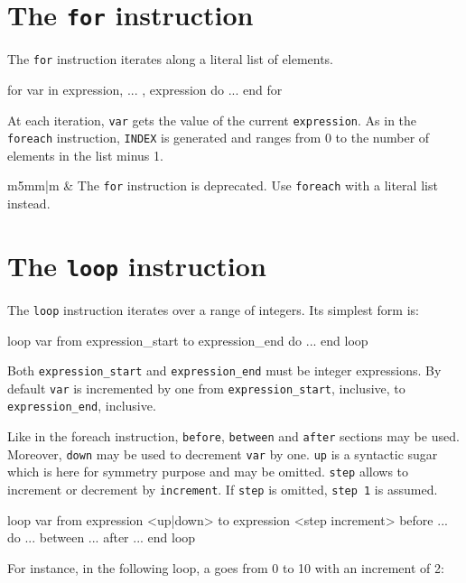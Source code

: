 \documentclass[10pt,openright,twosides,final]{memoir}
\newcommand{\var}[1]{{\small\ttfamily #1}}
\newcommand{\icst}[1]{{\footnotesize\ttfamily\colorbox{light-blue}{#1}}}
\newcommand{\gtlinline}[1]{\colorbox{light-blue}{\lstinline[language=gtl]{#1}}}
\newcommand\Warning{%
 \makebox[1.4em][c]{%
 \makebox[0pt][c]{\raisebox{-.05em}{\scriptsize!}}%
 \makebox[0pt][c]{\raisebox{-.2em}{\color{red}\Large$\bigtriangleup$}}}}%
\newcommand{\warning}[1]{%
\vspace{1em}
\hspace{-18.3mm}
\rowcolors{1}{white}{light-gray}
\begin{tabular}[b]{m{5mm}|m{\linewidth}}
\Warning & #1\\
\end{tabular}
}
\begin{document}
%
%
\section{The \texttt{for} instruction}

The \gtlinline{for} instruction iterates along a literal list of elements.

\begin{gtl}
for var in expression, ... , expression do
  ...
end for
\end{gtl}

At each iteration, \gtlinline{var} gets the value of the current \gtlinline{expression}. As in the \gtlinline{foreach} instruction, \gtlinline{INDEX} is generated and ranges from \icst{0} to the number of elements in the list minus 1.

\warning{The \gtlinline{for} instruction is deprecated. Use \gtlinline{foreach} with a literal list instead.}

\section{The \texttt{loop} instruction}

The \gtlinline{loop} instruction iterates over a range of integers. Its simplest form is:

\begin{gtl}
loop var from expression_start to expression_end do
  ...
end loop
\end{gtl}

Both \gtlinline{expression_start} and \gtlinline{expression_end} must be integer expressions. By default \gtlinline{var} is incremented by one from \gtlinline{expression_start}, inclusive, to \gtlinline{expression_end}, inclusive. 

Like in the foreach instruction, \gtlinline{before},  \gtlinline{between} and \gtlinline{after} sections may be used. Moreover, \gtlinline{down} may be used to decrement \gtlinline{var} by one. \gtlinline{up} is a syntactic sugar which is here for symmetry purpose and may be omitted. \gtlinline{step} allows to increment or decrement by \gtlinline{increment}. If \gtlinline{step} is omitted, \gtlinline{step 1} is assumed.

\begin{gtl}
loop var from expression <up|down> to expression <step increment>
  before ...
  do ...
  between ...
  after ...
end loop
\end{gtl}

\noindent For instance, in the following loop, \var{a} goes from 0 to 10 with an increment of 2:
\end{document}
